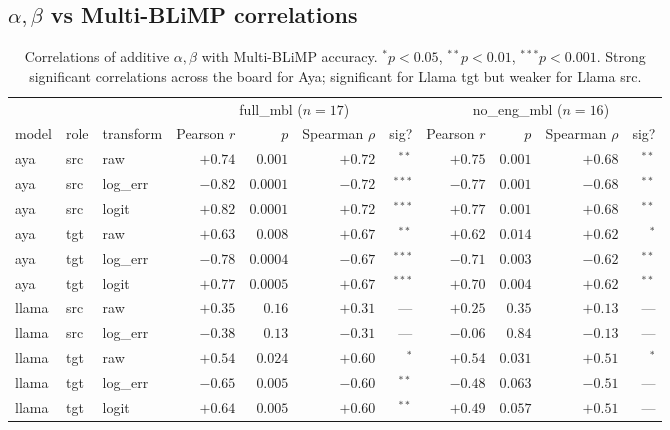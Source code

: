 \documentclass[11pt]{article}
\begin{document}
\subsection{$\alpha, \beta$ vs Multi-BLiMP correlations}

\begin{table}[h]
\centering
\small
\begin{tabular}{lllrrrr|rrrr}
\toprule
 & & & \multicolumn{4}{c|}{full\_mbl ($n=17$)} & \multicolumn{4}{c}{no\_eng\_mbl ($n=16$)} \\
model & role & transform & Pearson $r$ & $p$ & Spearman $\rho$ & sig?\@ & Pearson $r$ & $p$ & Spearman $\rho$ & sig?\@ \\
\midrule
aya   & src & raw     & $+0.74$ & $0.001$ & $+0.72$ & $^{**}$ & $+0.75$ & $0.001$ & $+0.68$ & $^{**}$ \\
aya   & src & log\_err & $-0.82$ & $0.0001$ & $-0.72$ & $^{***}$ & $-0.77$ & $0.001$ & $-0.68$ & $^{**}$ \\
aya   & src & logit   & $+0.82$ & $0.0001$ & $+0.72$ & $^{***}$ & $+0.77$ & $0.001$ & $+0.68$ & $^{**}$ \\
aya   & tgt & raw     & $+0.63$ & $0.008$ & $+0.67$ & $^{**}$ & $+0.62$ & $0.014$ & $+0.62$ & $^{*}$ \\
aya   & tgt & log\_err & $-0.78$ & $0.0004$ & $-0.67$ & $^{***}$ & $-0.71$ & $0.003$ & $-0.62$ & $^{**}$ \\
aya   & tgt & logit   & $+0.77$ & $0.0005$ & $+0.67$ & $^{***}$ & $+0.70$ & $0.004$ & $+0.62$ & $^{**}$ \\
\midrule
llama & src & raw     & $+0.35$ & $0.16$ & $+0.31$ & --- & $+0.25$ & $0.35$ & $+0.13$ & --- \\
llama & src & log\_err & $-0.38$ & $0.13$ & $-0.31$ & --- & $-0.06$ & $0.84$ & $-0.13$ & --- \\
llama & tgt & raw     & $+0.54$ & $0.024$ & $+0.60$ & $^{*}$ & $+0.54$ & $0.031$ & $+0.51$ & $^{*}$ \\
llama & tgt & log\_err & $-0.65$ & $0.005$ & $-0.60$ & $^{**}$ & $-0.48$ & $0.063$ & $-0.51$ & --- \\
llama & tgt & logit   & $+0.64$ & $0.005$ & $+0.60$ & $^{**}$ & $+0.49$ & $0.057$ & $+0.51$ & --- \\
\bottomrule
\end{tabular}
\caption{Correlations of additive $\alpha, \beta$ with Multi-BLiMP
accuracy. $^{*}p<0.05$, $^{**}p<0.01$, $^{***}p<0.001$. Strong
significant correlations across the board for Aya; significant for
Llama tgt but weaker for Llama src.}
\end{table}
\end{document}
